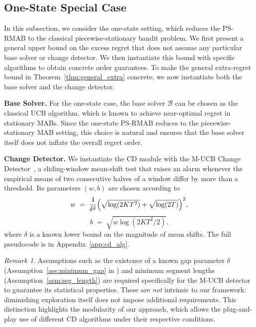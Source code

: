 \documentclass[twoside]{article}
\theoremstyle{plain}
\theoremstyle{definition}
\theoremstyle{remark}
\newtheorem{remark}[theorem]{Remark}
\begin{document}
\subsection{One-State Special Case} \label{subsec:one-state}
\vspace{-5pt}
In this subsection, we consider the one-state setting, which reduces the PS-RMAB
to the classical piecewise-stationary bandit problem. 
We first present a general upper bound on the excess regret that does not assume
any particular base solver or change detector. 
We then instantiate this bound with specific algorithms to obtain concrete order guarantees. To make the general extra-regret bound in Theorem~\ref{thm:general_extra} 
concrete, we now instantiate both the base solver and the change detector. 

\textbf{Base Solver.} 
For the one-state case, the base solver $\mathcal{B}$ can be chosen as the classical 
UCB algorithm, which is known to achieve near-optimal regret in stationary MABs. 
Since the one-state PS-RMAB reduces to the piecewise-stationary MAB setting, 
this choice is natural and ensures that the base solver itself does not inflate 
the overall regret order.

\textbf{Change Detector.} 
We instantiate the CD module with the M-UCB Change Detector~\citep{cao2019nearly}, 
a sliding-window mean-shift test that raises an alarm whenever the empirical 
means of two consecutive halves of a window differ by more than a threshold. 
Its parameters $(w,b)$ are chosen according to
\begin{equation}
    w \;=\; \frac{4}{\delta^2}\Bigl(\sqrt{\log(2KT^2)} + \sqrt{\log(2T)}\Bigr)^2, \label{eqn:w}
\end{equation}
\begin{equation}
b \;=\; \sqrt{w \log(2KT^2/2)}.  \label{eqn:b}
\end{equation}
where $\delta$ is a known lower bound on the magnitude of mean shifts. 
The full pseudocode is in Appendix~\ref{app:cd_alg}. 

\begin{remark}
Assumptions such as the existence of a known gap parameter $\delta$ 
(Assumption~\ref{ass:minimum_gap} in \cite{cao2019nearly}) and minimum segment lengths 
(Assumption~\ref{asm:seg_length}) are required specifically for the M-UCB detector to guarantee 
its statistical properties. These are \emph{not} intrinsic to our framework: 
diminishing exploration itself does not impose additional requirements. 
This distinction highlights the modularity of our approach, which allows the 
plug-and-play use of different CD algorithms under their respective conditions. 
\end{remark}
\end{document}

